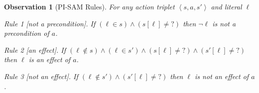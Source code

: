 \documentclass[letterpaper]{article} %
\newcommand{\tuple}[1]{\ensuremath{\left \langle #1 \right \rangle }}
\newcommand{\pre}{\textit{pre}}
\newcommand{\eff}{\textit{eff}}
\newcommand{\true}{\textit{true}}
\newcommand{\false}{\textit{false}}
\newcommand{\unobserved}{\textit{?}}
\newtheorem{observation}[theorem]{Observation}
\begin{document}
\begin{observation}[PI-SAM Rules]\label{obs:pi-sam-learning-rules}
For any action triplet $\tuple{s, a, s'}$ and literal $\ell$%
\begin{compactitem}
    \item[Rule 1][not a precondition]. If $\left(\ell\in s\right)\wedge
    \left(s[\ell]\neq\unobserved\right)$ 
    then $\neg \ell$ is not a precondition of $a$. 
    \item[Rule 2][an effect]. If 
    $\left(\ell\notin s\right)\wedge
     \left(\ell\in s'\right)\wedge
    \left(s[\ell]\neq\unobserved\right)\wedge
     \left(s'[\ell]\neq\unobserved\right)$ then $\ell$ is an effect of $a$.
    \item[Rule 3][not an effect]. If 
    $\left(\ell\notin s'\right)\wedge
    \left(s'[\ell]\neq\unobserved\right)$ then $\ell$ is not an effect of $a$.


    

    
    
    
\end{compactitem}
\end{observation}
\end{document}
